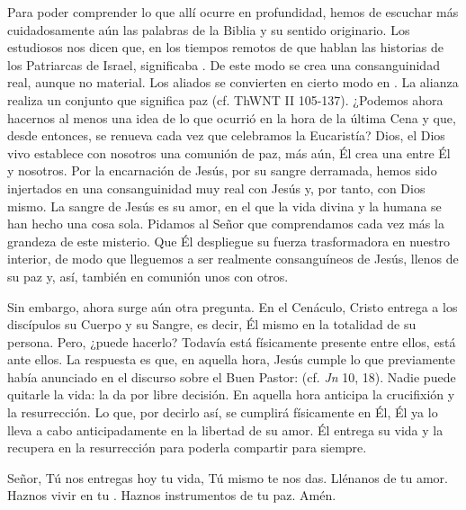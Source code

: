 \begin{body}
Para poder comprender lo que allí ocurre en profundidad, hemos de escuchar más cuidadosamente aún las palabras de la Biblia y su sentido originario. Los estudiosos nos dicen que, en los tiempos remotos de que hablan las historias de los Patriarcas de Israel,  significaba . De este modo se crea una consanguinidad real, aunque no material. Los aliados se convierten en cierto modo en . La alianza realiza un conjunto que significa paz (cf. ThWNT II 105-137). ¿Podemos ahora hacernos al menos una idea de lo que ocurrió en la hora de la última Cena y que, desde entonces, se renueva cada vez que celebramos la Eucaristía? Dios, el Dios vivo establece con nosotros una comunión de paz, más aún, Él crea una  entre Él y nosotros. Por la encarnación de Jesús, por su sangre derramada, hemos sido injertados en una consanguinidad muy real con Jesús y, por tanto, con Dios mismo. La sangre de Jesús es su amor, en el que la vida divina y la humana se han hecho una cosa sola. Pidamos al Señor que comprendamos cada vez más la grandeza de este misterio. Que Él despliegue su fuerza trasformadora en nuestro interior, de modo que lleguemos a ser realmente consanguíneos de Jesús, llenos de su paz y, así, también en comunión unos con otros.

Sin embargo, ahora surge aún otra pregunta. En el Cenáculo, Cristo entrega a los discípulos su Cuerpo y su Sangre, es decir, Él mismo en la totalidad de su persona. Pero, ¿puede hacerlo? Todavía está físicamente presente entre ellos, está ante ellos. La respuesta es que, en aquella hora, Jesús cumple lo que previamente había anunciado en el discurso sobre el Buen Pastor:  (cf. \textit{Jn} 10, 18). Nadie puede quitarle la vida: la da por libre decisión. En aquella hora anticipa la crucifixión y la resurrección. Lo que, por decirlo así, se cumplirá físicamente en Él, Él ya lo lleva a cabo anticipadamente en la libertad de su amor. Él entrega su vida y la recupera en la resurrección para poderla compartir para siempre.

Señor, Tú nos entregas hoy tu vida, Tú mismo te nos das. Llénanos de tu amor. Haznos vivir en tu . Haznos instrumentos de tu paz. Amén.
\end{body}

